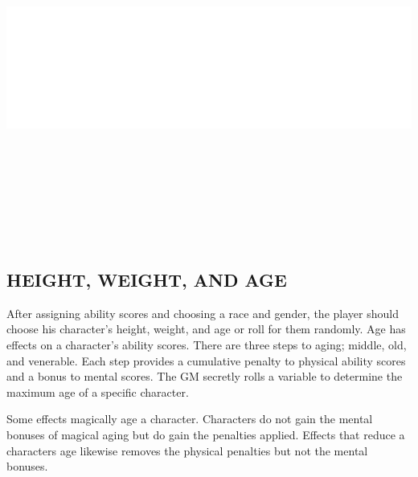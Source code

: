 \noindent\includegraphics[width=\columnwidth, height=4.5in]{testblock.pdf}  

\begin{multicols}{2}

\section{HEIGHT, WEIGHT, AND AGE}

After assigning ability scores and choosing a race and gender, the player should choose his character's height, weight, and age or roll for them randomly.  Age has effects on a character's ability scores.  There are three steps to aging; middle, old, and venerable.  Each step provides a cumulative penalty to physical ability scores and a bonus to mental scores.  The GM secretly rolls a variable to determine the maximum age of a specific character.

Some effects magically age a character.  Characters do not gain the mental bonuses of magical aging but do gain the penalties applied.  Effects that reduce a characters age likewise removes the physical penalties but not the mental bonuses.

\end{multicols}



